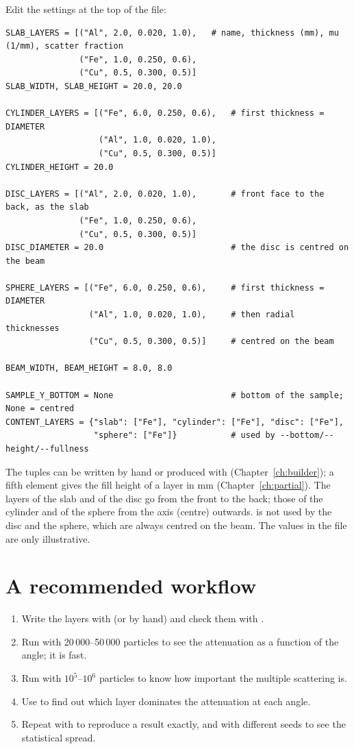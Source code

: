 Edit the settings at the top of the file:
\begin{lstlisting}
SLAB_LAYERS = [("Al", 2.0, 0.020, 1.0),   # name, thickness (mm), mu (1/mm), scatter fraction
               ("Fe", 1.0, 0.250, 0.6),
               ("Cu", 0.5, 0.300, 0.5)]
SLAB_WIDTH, SLAB_HEIGHT = 20.0, 20.0

CYLINDER_LAYERS = [("Fe", 6.0, 0.250, 0.6),   # first thickness = DIAMETER
                   ("Al", 1.0, 0.020, 1.0),
                   ("Cu", 0.5, 0.300, 0.5)]
CYLINDER_HEIGHT = 20.0

DISC_LAYERS = [("Al", 2.0, 0.020, 1.0),       # front face to the back, as the slab
               ("Fe", 1.0, 0.250, 0.6),
               ("Cu", 0.5, 0.300, 0.5)]
DISC_DIAMETER = 20.0                          # the disc is centred on the beam

SPHERE_LAYERS = [("Fe", 6.0, 0.250, 0.6),     # first thickness = DIAMETER
                 ("Al", 1.0, 0.020, 1.0),     # then radial thicknesses
                 ("Cu", 0.5, 0.300, 0.5)]     # centred on the beam

BEAM_WIDTH, BEAM_HEIGHT = 8.0, 8.0

SAMPLE_Y_BOTTOM = None                        # bottom of the sample; None = centred
CONTENT_LAYERS = {"slab": ["Fe"], "cylinder": ["Fe"], "disc": ["Fe"],
                  "sphere": ["Fe"]}           # used by --bottom/--height/--fullness
\end{lstlisting}
The tuples can be written by hand or produced with  (Chapter~\ref{ch:builder}); a fifth element gives the fill
height of a layer in mm (Chapter~\ref{ch:partial}). The layers of the slab and of the disc go from the front to the back; those of the
cylinder and of the sphere from the axis (centre) outwards.  is not used by the disc and the sphere, which are
always centred on the beam. The values in the file are only illustrative.

\section{A recommended workflow}

\begin{enumerate}
  \item \raggedright Write the layers with  (or by hand) and check them with \allowbreak{}.
  \item Run  with 20\,000--50\,000 particles to see the attenuation as a function of the angle; it is fast.
  \item Run  with $10^5$--$10^6$ particles to know how important the multiple scattering is.
  \item Use  to find out which layer dominates the attenuation at each angle.
  \item Repeat with  to reproduce a result exactly, and with different seeds to see the statistical spread.
\end{enumerate}


